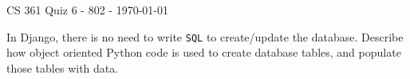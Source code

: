 \documentclass{exam}
\begin{document}
	
	\begin{center}
		CS 361 Quiz 6 - 802 - \today
	\end{center}
	
	\vspace{1em}
	
	\begin{center}
	\end{center}
	
	\begin{questions}
		
		\question[10] In Django, there is no need to write \texttt{SQL} to create/update the database. Describe how object oriented Python code is used to create database tables, and populate those tables with data. 
		
	\end{questions}
	
\end{document}
